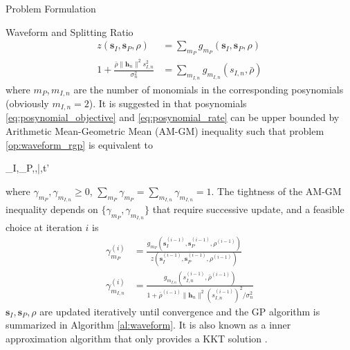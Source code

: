 \documentclass[journal]{IEEEtran}
\begin{document}
\begin{section}{Problem Formulation}
\begin{subsection}{Waveform and Splitting Ratio}
		\begin{align}
			z(\boldsymbol{s}_I,\boldsymbol{s}_P,\rho)&=\sum_{m_P}{g_{m_P}(\boldsymbol{s}_I,\boldsymbol{s}_P,\rho)}\label{eq:posynomial_objective}\\
			1+\frac{\bar{\rho}\lVert{\boldsymbol{h}_n}\rVert^2 s_{I,n}^2}{\sigma_n^2}&=\sum_{m_{I,n}}g_{m_{I,n}}(s_{I,n},\bar{\rho})\label{eq:posynomial_rate}
		\end{align}
		where $m_P,m_{I,n}$ are the number of monomials in the corresponding posynomials (obviously $m_{I,n}=2$). It is suggested in \cite{Clerckx2018b,Chiang2005} that posynomials \ref{eq:posynomial_objective} and \ref{eq:posynomial_rate} can be upper bounded by Arithmetic Mean-Geometric Mean (AM-GM) inequality such that problem \ref{op:waveform_rgp} is equivalent to
		\begin{mini}
			{\boldsymbol{s}_I,_P,\rho,\bar{\rho},t'}{}{\label{op:waveform_gp}}{}
		\end{mini}
		where $\gamma_{m_P},\gamma_{m_{I,n}} \ge 0$, $\sum_{m_P}\gamma_{m_P}=\sum_{m_{I,n}}\gamma_{m_{I,n}}=1$. The tightness of the AM-GM inequality depends on $\{\gamma_{m_P},\gamma_{m_{I,n}}\}$ that require successive update, and a feasible choice at iteration $i$ is \cite{Clerckx2018b}
		\begin{align}
			\gamma_{m_P}^{(i)} & = \frac{g_{m_P}(\boldsymbol{s}_I^{(i-1)},\boldsymbol{s}_P^{(i-1)},\rho^{(i-1)})}{z(\boldsymbol{s}_I^{(i-1)},\boldsymbol{s}_P^{(i-1)},\rho^{(i-1)})}\label{eq:gamma_P}\\
			\gamma_{m_{I,n}}^{(i)} & = \frac{g_{m_{I,n}}(s_{I,n}^{(i-1)},\bar{\rho}^{(i-1)})}{1+{\bar{\rho}^{(i-1)}\lVert{\boldsymbol{h}_n}\rVert^2 (s_{I,n}^{(i-1)})^2}/{\sigma_n^2}}\label{eq:gamma_I}
		\end{align}
		$\boldsymbol{s}_I,\boldsymbol{s}_P,\rho$ are updated iteratively until convergence and the GP algorithm is summarized in Algorithm \ref{al:waveform}. It is also known as a inner approximation algorithm that only provides a KKT solution \cite{Marks1978}.
		\begin{algorithm}
			\caption{GP: Waveform and Splitting Ratio}

\end{algorithm}
\end{subsection}
\end{section}
\end{document}
